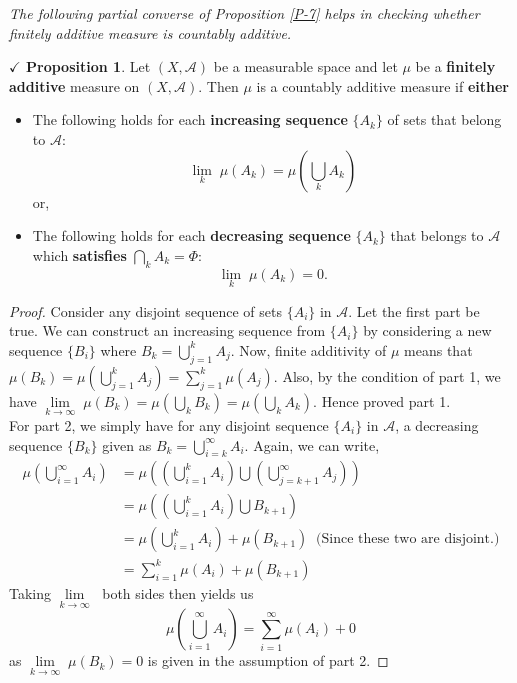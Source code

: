 \documentclass{article}
\theoremstyle{definition}
\theoremstyle{remark}
\theoremstyle{definition}
\theoremstyle{definition}
\newtheorem{proposition}{$\checkmark$ Proposition}
\theoremstyle{definition}
\newcommand{\bunion}{\bigcup}
\newcommand{\bintrs}{\bigcap}
\newcommand{\alg}[1]{\mathscr{#1}}
\newcommand{\m}[1]{\mu\left (#1\right )}
\newcommand{\limit}[2]{\underset{#1}{\lim}\; #2}
\begin{document}
\emph{The following partial converse of Proposition \ref{P-7} helps in checking whether finitely additive measure is countably additive.}
\begin{proposition}
	\label{P-8}
	Let $ (X,\alg{A}) $ be a measurable space and let $ \mu$ be a \textbf{finitely additive} measure on $ (X,\alg{A}) $. Then $ \mu $ is a countably additive measure if \textbf{either}
	\begin{itemize}
		\item {The following holds for each \textbf{increasing sequence} $ \{A_k\} $ of sets that belong to $ \alg{A} $:
	\[\limit{k}{\m{A_k}} = \m{\bunion_k A_k}\]	
	or,
	}
\item {The following holds for each \textbf{decreasing sequence} $ \{A_k\} $ that belongs to $ \alg{A} $ which \textbf{satisfies} $ \bintrs_k A_k = \Phi $:
\[\limit{k}\m{A_k} = 0.\]
 }
	\end{itemize}
\end{proposition}
\begin{proof}
	Consider any disjoint sequence of sets $ \{A_i\} $ in $ \alg{A} $. Let the first part be true. We can construct an increasing sequence from $ \{A_i\} $ by considering a new sequence $ \{B_i\} $ where $ B_k = \bunion_{j=1}^k A_j  $. Now, finite additivity of $ \mu $ means that $ \m{B_k}  = \m{\bunion_{j=1}^{k} A_j} = \sum_{j=1}^k \m{A_j}$. Also, by the condition of part 1, we have $ \limit{k\to \infty}{\m{B_k}}  = \m{\bunion_{k} B_k} = \m{\bunion_k A_k}$. Hence proved part 1.\\
	For part 2, we simply have for any disjoint sequence $ \{A_i\} $ in $ \alg{A} $, a decreasing sequence $ \{B_k\} $ given as $ B_k = \bunion_{i=k}^\infty A_i $. Again, we can write,
	\begin{equation*}
		\begin{split}
			\m{\bunion_{i=1}^\infty A_i} &= \m{\left (\bunion_{i=1}^k A_i\right ) \bunion \left (\bunion_{j=k+1}^\infty A_j\right )}\\
			&= \m{\left (\bunion_{i=1}^k A_i\right ) \bunion B_{k+1}}\\
			&= \m{\bunion_{i=1}^k A_i} + \m{B_{k+1}}\;\;\text{(Since these two are disjoint.)}\\
			&= \sum_{i=1}^k \m{A_i} + \m{B_{k+1}}   
		\end{split}
	\end{equation*}
	Taking $ \limit{k\to \infty}{} $ both sides then yields us 
	\[\m{\bunion_{i=1}^\infty A_i} = \sum_{i=1}^\infty \m{A_i} + 0 \]
as $ \limit{k\to \infty}{\m{B_k}} =0$ is given in the assumption of part 2.
\end{proof}
\hrulefill
\newpage
\end{document}
